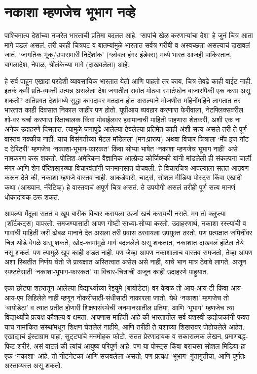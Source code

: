 \chapter{नकाशा म्हणजेच भूभाग नव्हे}

पाश्चिमात्य देशांच्या नजरेत भारताची प्रतिमा बदलत आहे. ‘सापांचे खेळ करणाऱ्यांचा देश’ हे जुनं चित्र आता मागे पडलं असलं, तरी काही चित्रपट व बातम्यांमुळे भारतात सर्वत्र गरीबी व अस्वच्छता असल्याचं दाखवलं जातं. ‘जागतिक भूक/उपासमारी निर्देशांक’ (ग्लोबल हंगर इंडेक्स) मध्ये भारत आजही पाकिस्तान, बांगलादेश, नेपाळ, श्रीलंकेच्या मागे (दाखवलेला) आहे.

हे सर्व पाहून एखादा परदेशी व्यावसायिक भारतात येतो आणि पाहतो तर काय, चित्र तेवढे काही वाईट नाही. इतकं कमी प्रति-व्यक्ती उत्पन्न असलेला देश जगातील सर्वात मोठ्या स्मार्टफोन बाजारांपैकी एक कसा असू शकतो? अतिप्रगत देशांमध्ये सुद्धा कागदावर मतदान होत असल्याने मोजणीस महिनोंमहिने लागतात तर भारतात काही दिवसात निकाल जाहीर पण होतो. यूपीआय व्यवहार करणारा फेरीवाला, नेटफ्लिक्सवरील शो-वर चर्चा करणारा रिक्षाचालक किंवा मोबाईलवर हवामानाची माहिती पाहणारा शेतकरी, अशी एक ना अनेक उदाहरणे दिसतात. त्यामुळे जगापुढे आलेल्या-ठेवलेल्या प्रतिमेत काही अंशी सत्य असले तरी ते पूर्ण वास्तव नक्कीच  नाही. याच विसंगतीच्या मेंटल मॉडेलला (मन:प्रारूप) अथवा विचार चित्राला ‘मॅप इज नॉट द टेरिटरी’ म्हणजेच ‘नकाशा-भूभाग-फारकत’ किंवा सोप्या भाषेत ‘नकाशा म्हणजेच भूभाग नाही’ असे नामकरण करू शकतो. पोलिश-अमेरिकन वैज्ञानिक आल्फ्रेड कोर्जिब्स्की यांनी मांडलेली ही संकल्पना चार्ली मंगर आणि शेन पॅरिशसारख्या विचारवंतांनी जनमानसात पोचवली. हे विचारचित्र आपल्याला सतत आठवण करून देते की, नकाशा म्हणजे वास्तव नाही. आकडेवारी, चार्ट्स, सोशल मीडिया पोस्ट्स किंवा एखादी कथा (आख्यान, नॅरेटिव्ह) हे वास्तवाचं अपूर्ण चित्र असतं. ते उपयोगी असलं तरीही पूर्ण सत्य मानणं धोकादायक ठरू शकतं.

आपल्या मेंदूला सतत व खूप बारीक विचार करायला ऊर्जा खर्च करायची नसते. मग तो क्लुप्त्या (शॉर्टकट्स) वापरतो. समजण्यासाठी आपण गोष्टी साध्या-सोप्या करतो. उदाहरणार्थ, नकाशा रस्त्यांची व गावांची माहिती जरी ढोबळ मानाने देत असला तरी प्रवास ठरवायला उपयुक्त ठरतो. पण प्रत्यक्षात जमिनींवर चित्र थोडे वेगळे असू शकते, खोद-कामांमुळे मार्ग बदललेले असू शकतात, नकाशात दाखवलं हॉटेल तेथे नसू शकतं. पण त्यामुळे खूप काही अडत नाही. पण जेव्हा आपण नकाशालाच वास्तव समजतो, तेव्हा आपण अशा स्थितीत निर्णय घेतो जे प्रत्यक्षात अस्तित्वात असेल असे नाही, याचे भान मात्र ठेवावे लागते. अजून स्पष्टतेसाठी ‘नकाशा-भूभाग-फारकत’ या विचार-चित्राची अजून काही उदाहरणे पाहुयात. 

एका छोट्या शहरातून आलेल्या विद्यार्थ्याच्या रेझ्युमे (बायोडेटा) वर केवळ तो आय-आय-टी किंवा आय-आय-एम लिहिलेले नाही म्हणून नोकरीसाठी-संधीसाठी नाकारला जातो. येथे ‘नकाशा’ म्हणजेच तो ‘बायोडेटा’ व त्यात प्रतीत होणारी शिक्षणसंस्थेची जनमानसातील प्रतिमा, आणि ‘भूभाग’ म्हणजेच त्या विद्यार्थ्यांचे प्रत्यक्ष कौशल्य व क्षमता. आपणास माहिती आहे की भारतातील सर्व यशस्वी उद्योजकांनी फक्त याच नामांकित संस्थांमधून शिक्षण घेतलेलं नाहीये, आणि तरीही ते यशाच्या शिखरावर पोहोचलेले आहेत. 
एखाद्याचं इंस्टाग्राम पाहा, सुट्ट्यांचे मनमोहक फोटो, सतत प्रेरणादायक व सकारात्मक लेखन, प्रमाणबद्ध-फिट शरीरं. असं वाटतं की त्यांचं आयुष्य परिपूर्ण आहे. पण या पोस्ट्स किंवा बराचसा सोशल मिडिया हा एक ‘नकाशा’ आहे. तो नीटनेटका आणि सजवलेला असतो; पण प्रत्यक्ष 'भूभाग' गुंतागुंतीचा, आणि पूर्णतः अस्ताव्यस्त असू शकतो.


